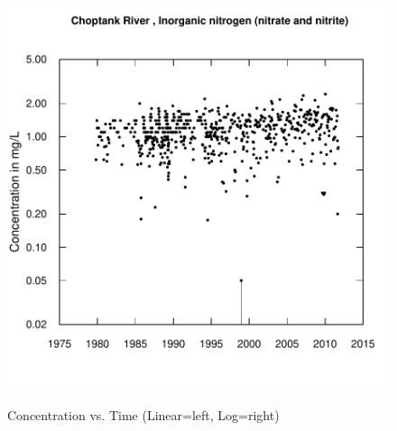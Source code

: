 \documentclass[a4paper,11pt]{article}
\begin{document}
\begin{figure}[htbp]
\begin{minipage}[h]{0.5\linewidth}
\begin{center}
\includegraphics{EGRET-figplotLogConcTime}
    \label{fig:plotLogConcTime}
    \end{center}
  \end{minipage}
  \caption{Concentration vs. Time (Linear=left, Log=right)}
  \label{fig:plotLogConcTimeANDplotConcTime}
\end{figure}
\end{document}
